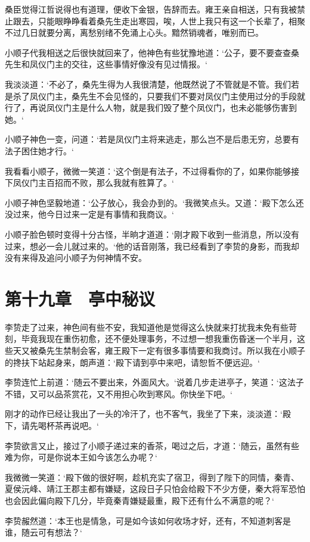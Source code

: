 桑臣觉得江哲说得也有道理，便收下金银，告辞而去。雍王亲自相送，只有我被禁止跟去，只能眼睁睁看着桑先生走出寒园，唉，人世上我只有这一个长辈了，相聚不过几日就要分离，离愁别绪不免涌上心头。黯然销魂者，唯别而已。

小顺子代我相送之后很快就回来了，他神色有些犹豫地道：‘公子，要不要查查桑先生和凤仪门主的交往，这些事情好像没有见过情报。‘

我淡淡道：‘不必了，桑先生得为人我很清楚，他既然说了不管就是不管。我们若是杀了凤仪门主，桑先生不会见怪的，只要我们不要对凤仪门主使用过分的手段就行了，再说凤仪门主是什么人物，就是我们毁了整个凤仪门，也未必能够伤害到她。‘

小顺子神色一变，问道：‘若是凤仪门主将来逃走，那么岂不是后患无穷，总要有法子困住她才行。‘

我看看小顺子，微微一笑道：‘这个倒是有法子，不过得看你的了，如果你能够接下凤仪门主百招而不败，那么我就有胜算了。‘

小顺子神色坚毅地道：‘公子放心，我会办到的。‘我微笑点头。又道：‘殿下怎么还没过来，他今日过来一定是有事情和我商议。‘

小顺子脸色顿时变得十分古怪，半晌才道道：‘刚才殿下收到一些消息，所以没有过来，想必一会儿就过来的。‘他的话音刚落，我已经看到了李贽的身影，而我却没有来得及追问小顺子为何神情不安。

\chapter{第十九章　亭中秘议}

李贽走了过来，神色间有些不安，我知道他是觉得这么快就来打扰我未免有些苛刻，毕竟我现在重伤初愈，还不便处理事务，不过想一想我重伤昏迷一个半月，这些天又被桑先生禁制会客，雍王殿下一定有很多事情要和我商讨。所以我在小顺子的搀扶下站起身来，朗声道：‘殿下请到亭中来吧，请恕哲不便远迎。‘

李贽连忙上前道：‘随云不要出来，外面风大。‘说着几步走进亭子，笑道：‘这法子不错，又可以品茶赏花，又不用担心吹到寒风。你快坐下吧。‘

刚才的动作已经让我出了一头的冷汗了，也不客气，我坐了下来，淡淡道：‘殿下，请先喝杯茶再说吧。‘

李贽欲言又止，接过了小顺子递过来的香茶，喝过之后，才道：‘随云，虽然有些难为你，可是你说本王如今该怎么办呢？‘

我微微一笑道：‘殿下做的很好啊，趁机充实了宿卫，得到了陛下的同情，秦青、夏侯沅峰、靖江王郡主都有嫌疑，这段日子只怕会给殿下不少方便，秦大将军恐怕也会因此偏向殿下几分，毕竟秦青嫌疑最重，殿下还有什么不满意的呢？‘

李贽赧然道：‘本王也是情急，可是如今该如何收场才好，还有，不知道刺客是谁，随云可有想法？‘

